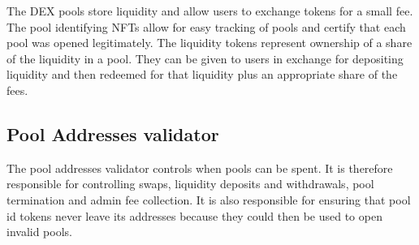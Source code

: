 \documentclass{article}
\begin{document}
The DEX pools store liquidity and allow users to exchange tokens
for a small fee.
The pool identifying NFTs allow for easy tracking of pools and
certify that each pool was opened legitimately.
The liquidity tokens represent ownership of a share of the liquidity
in a pool. They can be given to users in exchange for depositing liquidity
and then redeemed for that liquidity plus an appropriate share of the fees.

\subsection{Pool Addresses validator}

The pool addresses validator controls when pools can be spent.
It is therefore responsible for controlling swaps,
liquidity deposits and withdrawals, pool termination
and admin fee collection.
It is also responsible for ensuring that
pool id tokens never leave its addresses
because they could then be used to open invalid pools.
\end{document}
